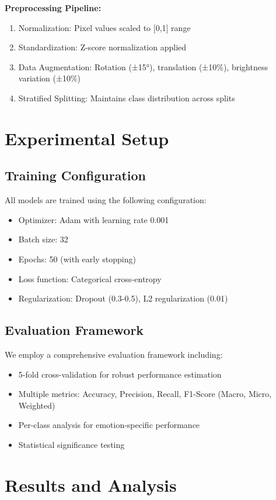 \textbf{Preprocessing Pipeline:}
\begin{enumerate}
    \item Normalization: Pixel values scaled to [0,1] range
    \item Standardization: Z-score normalization applied
    \item Data Augmentation: Rotation (±15°), translation (±10\%), brightness variation (±10\%)
    \item Stratified Splitting: Maintains class distribution across splits
\end{enumerate}

\section{Experimental Setup}

\subsection{Training Configuration}
All models are trained using the following configuration:
\begin{itemize}
    \item Optimizer: Adam with learning rate 0.001
    \item Batch size: 32
    \item Epochs: 50 (with early stopping)
    \item Loss function: Categorical cross-entropy
    \item Regularization: Dropout (0.3-0.5), L2 regularization (0.01)
\end{itemize}

\subsection{Evaluation Framework}
We employ a comprehensive evaluation framework including:
\begin{itemize}
    \item 5-fold cross-validation for robust performance estimation
    \item Multiple metrics: Accuracy, Precision, Recall, F1-Score (Macro, Micro, Weighted)
    \item Per-class analysis for emotion-specific performance
    \item Statistical significance testing
\end{itemize}

\section{Results and Analysis}

